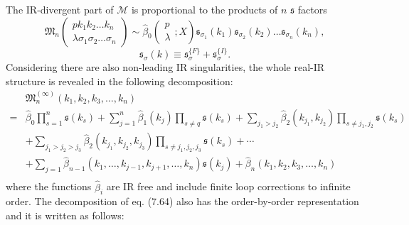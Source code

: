 The IR-divergent part of $\mathcal{M}$ is proportional to the products of $n$ $\mathfrak{s}$ factors
\begin{equation}
\mathfrak{M}_n\left(\begin{array}{c}
pk_1k_2\ldots k_n\\\lambda\sigma_1\sigma_2\ldots\sigma_n
\end{array}
\right)\sim\hat{\beta}_0\left( \begin{array}{c}
p\\
\lambda
\end{array};X \right)\mathfrak{s}_{\sigma_1}(k_1)\mathfrak{s}_{\sigma_2}(k_2)\ldots\mathfrak{s}_{\sigma_n}(k_n),
\end{equation}
\begin{equation}
\mathfrak{s}_\sigma(k)\equiv\mathfrak{s}_\sigma^{\{F\}}+\mathfrak{s}_\sigma^{\{I\}}.
\end{equation}
Considering there are also non-leading IR singularities, the whole real-IR structure is revealed in the following decomposition:
\begin{align}
&\mathfrak{M}_n^{(\infty)}(k_1,k_2,k_3,\ldots,k_n)\nonumber\\
=&\hat{\beta}_0\prod_{s=1}^{n}\mathfrak{s}(k_s)+\sum_{j=1}^{n}\hat{\beta}_1(k_j)\prod_{s\ne q}\mathfrak{s}(k_s)+\sum_{j_1>j_2}\hat{\beta}_2(k_{j_1},k_{j_2})\prod_{s\ne j_1,j_2}\mathfrak{s}(k_s)\nonumber\\
&+\sum_{j_1>j_2>j_3}\hat{\beta}_2(k_{j_1},k_{j_2},k_{j_3})\prod_{s\ne j_1,j_2,j_3}\mathfrak{s}(k_s)+\cdots\nonumber\\
&+\sum_{j=1}\hat{\beta}_{n-1}(k_1,\ldots,k_{j-1},k_{j+1},\ldots,k_n)\mathfrak{s}(k_j)+\hat{\beta}_n(k_1,k_2,k_3,\ldots,k_n)\nonumber\\
\end{align}
where the functions $\hat{\beta}_i$ are IR free and include finite loop corrections to infinite order. The decomposition of eq. (7.64) also has the order-by-order representation and it is written as follows:
